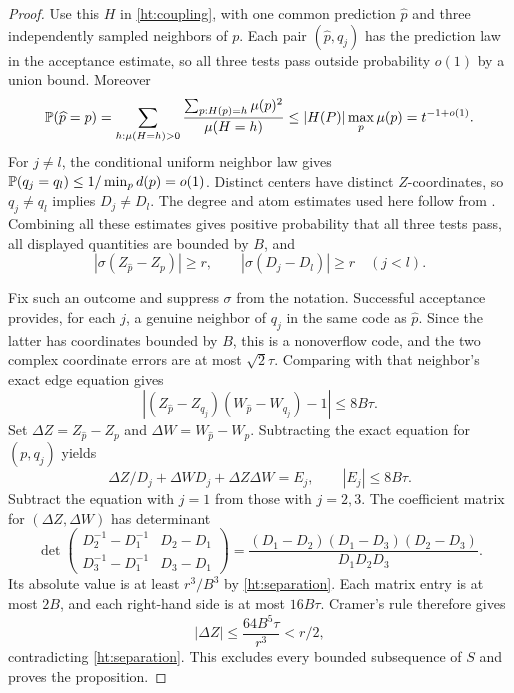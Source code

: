 \begin{proof}
Use this $H$ in \eqref{ht:coupling}, with one common prediction
$\widehat p$ and three independently sampled neighbors of $p$.
Each pair $(\widehat p,q_j)$ has the prediction law in the acceptance
estimate, so all three tests pass outside probability $o(1)$ by a union
bound. Moreover
\begin{equation}\label{ht:collisions}
 \mathbb P(\widehat p=p)
   =\sum_{h:\mu(H=h)>0}
      \frac{\sum_{p:H(p)=h}\mu(p)^2}{\mu(H=h)}
   \le |H(P)|\max_p\mu(p)=t^{-1+o(1)}.
\end{equation}
For $j\ne l$, the conditional uniform neighbor law gives
$\mathbb P(q_j=q_l)\le1/\min_p d(p)=o(1)$.
Distinct centers have distinct $Z$-coordinates, so $q_j\ne q_l$ implies
$D_j\ne D_l$. The degree and atom estimates used here follow from
. Combining all these estimates gives positive
probability that all three tests pass, all displayed quantities are
bounded by $B$, and
\begin{equation}\label{ht:separation}
 |\sigma(Z_{\widehat p}-Z_p)|\ge r,\qquad
 |\sigma(D_j-D_l)|\ge r\quad(j<l).
\end{equation}

Fix such an outcome and suppress $\sigma$ from the notation.
Successful acceptance provides, for each $j$, a genuine neighbor of
$q_j$ in the same code as $\widehat p$. Since the latter has coordinates
bounded by $B$, this is a nonoverflow code, and the two complex coordinate
errors are at most $\sqrt2\tau$. Comparing with that neighbor's exact
edge equation gives
\[
 |(Z_{\widehat p}-Z_{q_j})(W_{\widehat p}-W_{q_j})-1|
       \le8B\tau.
\]
Set $\Delta Z=Z_{\widehat p}-Z_p$ and
$\Delta W=W_{\widehat p}-W_p$. Subtracting the exact equation for
$(p,q_j)$ yields
\[
 \Delta Z/D_j+\Delta W D_j+\Delta Z\Delta W=E_j,
       \qquad |E_j|\le8B\tau.
\]
Subtract the equation with $j=1$ from those with $j=2,3$.
The coefficient matrix for $(\Delta Z,\Delta W)$ has determinant
\begin{equation}\label{ht:determinant}
 \det\begin{pmatrix}
   D_2^{-1}-D_1^{-1}&D_2-D_1\\
   D_3^{-1}-D_1^{-1}&D_3-D_1
 \end{pmatrix}
 =\frac{(D_1-D_2)(D_1-D_3)(D_2-D_3)}{D_1D_2D_3}.
\end{equation}
Its absolute value is at least $r^3/B^3$ by
\eqref{ht:separation}. Each matrix entry is at most $2B$, and each
right-hand side is at most $16B\tau$. Cramer's rule therefore gives
\[
 |\Delta Z|\le\frac{64B^5\tau}{r^3}<r/2,
\]
contradicting \eqref{ht:separation}. This excludes every bounded
subsequence of $S$ and proves the proposition.
\end{proof}

